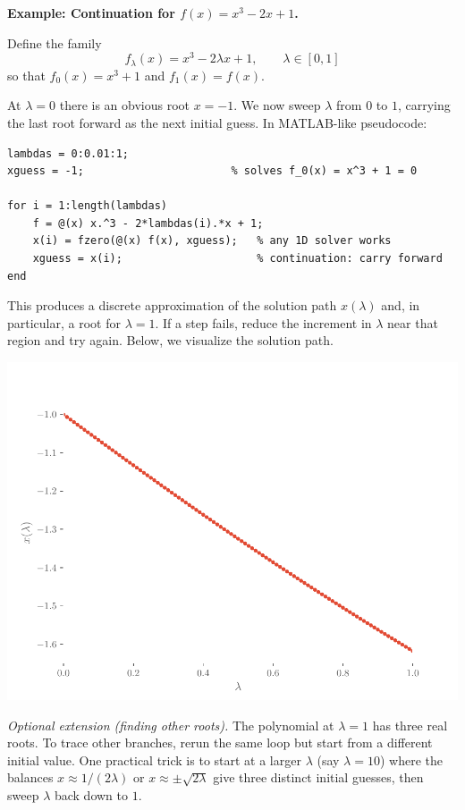 \begin{exampleBox}
    \textbf{Example: Continuation for $f(x)=x^3-2x+1$.}
    
    Define the family
    $$
    f_{\lambda}(x)=x^3-2\lambda x+1,\qquad \lambda\in[0,1]
    $$
    so that $f_0(x)=x^3+1$ and $f_1(x)=f(x)$.
    
    At $\lambda=0$ there is an obvious root $x=-1$. We now sweep $\lambda$ from $0$ to $1$, carrying the last root forward as the next initial guess. In MATLAB-like pseudocode:
    
    \begin{lstlisting}
lambdas = 0:0.01:1;
xguess = -1;                       % solves f_0(x) = x^3 + 1 = 0

for i = 1:length(lambdas)
    f = @(x) x.^3 - 2*lambdas(i).*x + 1;
    x(i) = fzero(@(x) f(x), xguess);   % any 1D solver works
    xguess = x(i);                     % continuation: carry forward
end
    \end{lstlisting}
    
    This produces a discrete approximation of the solution path $x(\lambda)$ and, in particular, a root for $\lambda=1$. If a step fails, reduce the increment in $\lambda$ near that region and try again. Below, we visualize the solution path.

    \begin{center}
        \includegraphics[width=.5\textwidth]{figs/nle/simple_continuation.pdf}
    \end{center}
    
    \emph{Optional extension (finding other roots).} The polynomial at $\lambda=1$ has three real roots. To trace other branches, rerun the same loop but start from a different initial value. One practical trick is to start at a larger $\lambda$ (say $\lambda=10$) where the balances $x \approx 1/(2\lambda)$ or $x \approx \pm\sqrt{2\lambda}$ give three distinct initial guesses, then sweep $\lambda$ back down to $1$.
\end{exampleBox}

